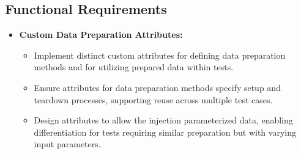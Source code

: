 \subsection{Functional Requirements}
\begin{itemize}
	\item \textbf{Custom Data Preparation Attributes:}

	      \begin{itemize}
		      \item Implement distinct custom attributes for defining data preparation methods and for utilizing prepared data within tests.
		      \item Ensure attributes for data preparation methods specify setup and teardown processes, supporting reuse across multiple test cases.
		      \item Design attributes to allow the injection parameterized data, enabling differentiation for tests requiring similar preparation but with varying input parameters.
	      \end{itemize}


\end{itemize}
